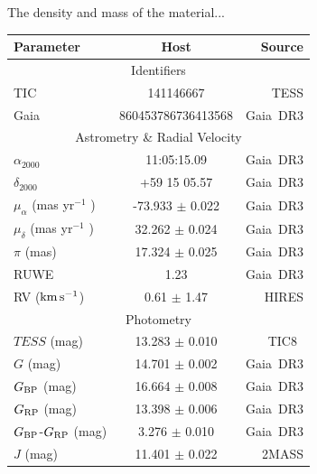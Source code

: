 \documentclass{nature3}
\newcommand{\kms}{\ensuremath{\rm km\,s^{-1}}}
\begin{document}
\begin{methods}
The density and mass of the material...




%
\begin{table}
    \centering
    \begin{tabular}{lcr}
    \hline 
    \hline
    Parameter & Host & Source \\
    \hline 
    \multicolumn{3}{c}{Identifiers} \\
    \hline
    TIC & 141146667 & TESS \\
    Gaia & 860453786736413568 & Gaia\ DR3 \\
    \hline
    \multicolumn{3}{c}{Astrometry \& Radial Velocity} \\ 
    \hline
    $\alpha_{2000}$ & 11:05:15.09   & Gaia\ DR3 \\
    $\delta_{2000}$ & +59 15 05.57  & Gaia\ DR3 \\
    $\mu_{\alpha}$ (mas yr$^{-1}$ ) & -73.933 $\pm$ 0.022 & Gaia\ DR3 \\
    $\mu_{\delta}$ (mas yr$^{-1}$ ) &  32.262 $\pm$ 0.024 & Gaia\ DR3 \\
    $\pi$ (mas)                     &  17.324 $\pm$ 0.025 & Gaia\ DR3 \\
    RUWE                            &  1.23               & Gaia\ DR3 \\
    RV (\kms)                     & 0.61 $\pm$ 1.47     & HIRES \\
    \hline
    \multicolumn{3}{c}{Photometry} \\
    \hline
    $TESS$ (mag)                    & 13.283 $\pm$ 0.010 & TIC8\     \\
    $G$ (mag)                       & 14.701 $\pm$ 0.002 & Gaia\ DR3 \\
    $G_{\rm BP}$ (mag)              & 16.664 $\pm$ 0.008 & Gaia\ DR3 \\
    $G_{\rm RP}$ (mag)              & 13.398 $\pm$ 0.006 & Gaia\ DR3 \\
    $G_{\rm BP}$-$G_{\rm RP}$ (mag) &  3.276 $\pm$ 0.010 & Gaia\ DR3 \\
    $J$ (mag)                       & 11.401 $\pm$ 0.022 & 2MASS     \\

\end{tabular}
\end{table}
\end{methods}
\end{document}
